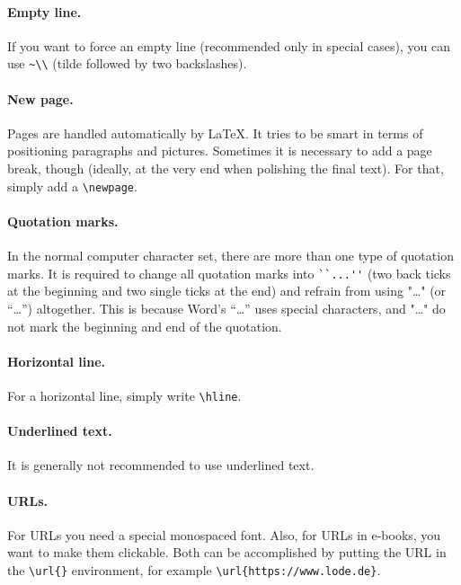 \paragraph{Empty line.} If you want to force an empty line (recommended only in
special cases), you can use \lstinline[language=Tex]!~\\! (tilde followed by two
backslashes).

\paragraph{New page.} Pages are handled automatically by \LaTeX{}. It tries to
be smart in terms of positioning paragraphs and pictures. Sometimes it is
necessary to add a page break, though (ideally, at the very end when polishing
the final text). For that, simply add a \lstinline[language=Tex]!\newpage!.

\paragraph{Quotation marks.} In the normal computer character set, there are
more than one type of quotation marks. It is required to change all quotation
marks into \lstinline[language=Tex]!``...''! (two back ticks at the beginning
and two single ticks at the end) and refrain from using "\dots" (or “\dots”)
altogether. This is because Word's “\dots” uses special characters, and "\dots"
do not mark the beginning and end of the quotation.

\paragraph{Horizontal line.} For a horizontal line, simply write
\lstinline[language=Tex]!\hline!.

\paragraph{Underlined text.} It is generally not recommended to use underlined
text.

\paragraph{URLs.} For URLs you need a special monospaced font. Also, for URLs in
e-books, you want to make them clickable. Both can be accomplished by putting
the URL in the \lstinline[language=Tex]!\url{}! environment, for example
\lstinline[language=Tex]!\url{https://www.lode.de}!.

